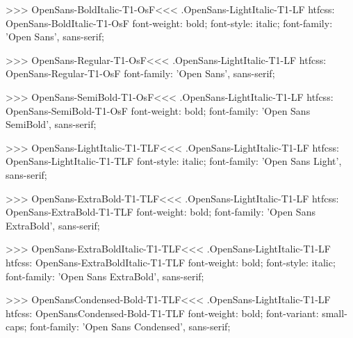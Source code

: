 >>>
\<OpenSans-BoldItalic-T1-OsF\><<<
.OpenSans-LightItalic-T1-LF
htfcss:  OpenSans-BoldItalic-T1-OsF  font-weight: bold; font-style: italic; font-family: 'Open Sans', sans-serif;

>>>
\<OpenSans-Regular-T1-OsF\><<<
.OpenSans-LightItalic-T1-LF
htfcss:  OpenSans-Regular-T1-OsF  font-family: 'Open Sans', sans-serif;

>>>
\<OpenSans-SemiBold-T1-OsF\><<<
.OpenSans-LightItalic-T1-LF
htfcss:  OpenSans-SemiBold-T1-OsF  font-weight: bold; font-family: 'Open Sans SemiBold', sans-serif;

>>>
\<OpenSans-LightItalic-T1-TLF\><<<
.OpenSans-LightItalic-T1-LF
htfcss:  OpenSans-LightItalic-T1-TLF  font-style: italic; font-family: 'Open Sans Light', sans-serif;

>>>
\<OpenSans-ExtraBold-T1-TLF\><<<
.OpenSans-LightItalic-T1-LF
htfcss:  OpenSans-ExtraBold-T1-TLF  font-weight: bold; font-family: 'Open Sans ExtraBold', sans-serif;

>>>
\<OpenSans-ExtraBoldItalic-T1-TLF\><<<
.OpenSans-LightItalic-T1-LF
htfcss:  OpenSans-ExtraBoldItalic-T1-TLF  font-weight: bold; font-style: italic; font-family: 'Open Sans ExtraBold', sans-serif;

>>>
\<OpenSansCondensed-Bold-T1-TLF\><<<
.OpenSans-LightItalic-T1-LF
htfcss:  OpenSansCondensed-Bold-T1-TLF  font-weight: bold; font-variant: small-caps; font-family: 'Open Sans Condensed', sans-serif;

